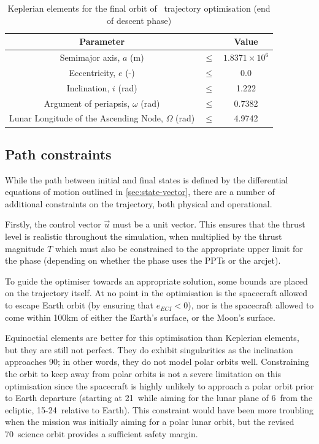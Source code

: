 \begin{table}[h]
\caption{Keplerian elements for the final orbit of \BW\ trajectory optimisation (end of descent phase)}
\label{tab:Phase-5-constraints}
\begin{center}
\begin{tabular} {ccc}\toprule
Parameter && Value\\\midrule
Semimajor axis, $a$ (m) &$\le$& $1.8371\times 10^6$\\
Eccentricity, $e$ (-) &$\le$& 0.0\\
Inclination, $i$ (rad) &$\le$& 1.222\\
Argument of periapsis, $\omega$ (rad) &$\le$& 0.7382 \\
Lunar Longitude of the Ascending Node, $\Omega$ (rad) &$\le$& 4.9742 \\\bottomrule
\end{tabular}
\end{center}
\end{table}

\subsection{Path constraints} \label{sec:Path-constraints}

While the path between initial and final states is defined by the differential equations of motion outlined in \autoref{sec:state-vector}, there are a number of additional constraints on the trajectory, both physical and operational.

Firstly, the control vector $\vec{u}$ must be a unit vector. This ensures that the thrust level is realistic throughout the simulation, when multiplied by the thrust magnitude $T$ which must also be constrained to the appropriate upper limit for the phase (depending on whether the phase uses the PPTs or the arcjet).

To guide the optimiser towards an appropriate solution, some bounds are placed on the trajectory itself. At no point in the optimisation is the spacecraft allowed to escape Earth orbit (by ensuring that $e_{ECI}<0$), nor is the spacecraft allowed to come within 100km of either the Earth's surface, or the Moon's surface.

Equinoctial elements are better for this optimisation than Keplerian elements, but they are still not perfect. They do exhibit singularities as the inclination approaches 90\degrees; in other words, they do not model polar orbits well. Constraining the orbit to keep away from polar orbits is not a severe limitation on this optimisation since the spacecraft is highly unlikely to approach a polar orbit prior to Earth departure (starting at 21\degrees\ while aiming for the lunar plane of 6\degrees\ from the ecliptic, 15-24\degrees\ relative to Earth). This constraint would have been more troubling when the mission was initially aiming for a polar lunar orbit, but the revised 70\degrees\ science orbit provides a sufficient safety margin.

